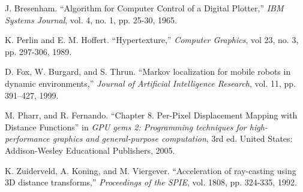\documentclass[letterpaper, 10 pt, conference]{ieeeconf}  %
\begin{document}
\begin{thebibliography}{99} 
 
  J. Bresenham. ``Algorithm for Computer Control of a Digital Plotter,'' \textit{IBM Systems Journal}, vol. 4, no. 1, pp. 25-30, 1965.

 K. Perlin and E. M. Hoffert. ``Hypertexture,'' \textit{Computer Graphics}, vol 23, no. 3, pp. 297-306, 1989.




 D. Fox, W. Burgard, and S. Thrun. ``Markov localization for mobile robots in dynamic environments,'' \textit{Journal of Artificial Intelligence Research}, vol. 11, pp. 391–427, 1999.

 M. Pharr, and R. Fernando. ``Chapter 8. Per-Pixel Displacement Mapping with Distance Functions'' in \textit{GPU gems 2: Programming techniques for high-performance graphics and general-purpose computation}, 3rd ed. United States: Addison-Wesley Educational Publishers, 2005.

 K. Zuiderveld, A. Koning, and M. Viergever. ``Acceleration of ray-casting using 3D distance transforms,'' \textit{Proceedings of the SPIE}, vol. 1808, pp. 324-335, 1992.

\end{thebibliography}
\end{document}
